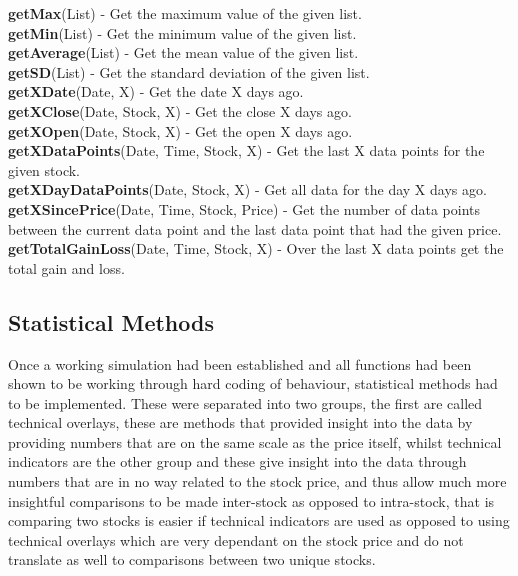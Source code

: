 \documentclass[12pt,a4paper]{article}
\begin{document}
\noindent
\textbf{getMax}(List) - Get the maximum value of the given list.\\

\noindent
\textbf{getMin}(List) - Get the minimum value of the given list.\\

\noindent
\textbf{getAverage}(List) - Get the mean value of the given list.\\

\noindent
\textbf{getSD}(List) - Get the standard deviation of the given list.\\

\noindent
\textbf{getXDate}(Date, X) - Get the date X days ago.\\

\noindent
\textbf{getXClose}(Date, Stock, X) - Get the close X days ago.\\

\noindent
\textbf{getXOpen}(Date, Stock, X) - Get the open X days ago.\\

\noindent
\textbf{getXDataPoints}(Date, Time, Stock, X) - Get the last X data points for the given stock.\\

\noindent
\textbf{getXDayDataPoints}(Date, Stock, X) - Get all data for the day X days ago.\\

\noindent
\textbf{getXSincePrice}(Date, Time, Stock, Price) - Get the number of data points between the current data point and the last data point that had the given price.\\

\noindent
\textbf{getTotalGainLoss}(Date, Time, Stock, X) - Over the last X data points get the total gain and loss.\\

\iffalse
#################################################################################
\fi

\subsection*{Statistical Methods}

Once a working simulation had been established and all functions had been shown to be working through hard coding of behaviour, statistical methods had to be implemented. These were separated into two groups, the first are called technical overlays, these are methods that provided insight into the data by providing numbers that are on the same scale as the price itself, whilst technical indicators are the other group and these give insight into the data through numbers that are in no way related to the stock price, and thus allow much more insightful comparisons to be made inter-stock as opposed to intra-stock, that is comparing two stocks is easier if technical indicators are used as opposed to using technical overlays which are very dependant on the stock price and do not translate as well to comparisons between two unique stocks. \\
\end{document}
